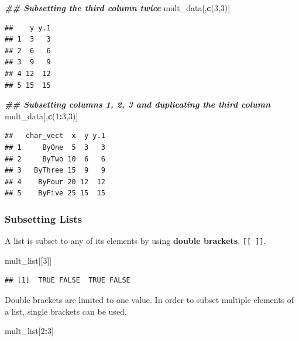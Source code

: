 \documentclass[
]{book}
\newenvironment{Shaded}{\begin{snugshade}}{\end{snugshade}}
\newcommand{\DecValTok}[1]{\textcolor[rgb]{0.00,0.00,0.81}{#1}}
\newcommand{\DocumentationTok}[1]{\textcolor[rgb]{0.56,0.35,0.01}{\textbf{\textit{#1}}}}
\newcommand{\FunctionTok}[1]{\textcolor[rgb]{0.13,0.29,0.53}{\textbf{#1}}}
\newcommand{\NormalTok}[1]{#1}
\newcommand{\SpecialCharTok}[1]{\textcolor[rgb]{0.81,0.36,0.00}{\textbf{#1}}}
\theoremstyle{definition}
\theoremstyle{definition}
\theoremstyle{definition}
\theoremstyle{definition}
\theoremstyle{remark}
\begin{document}
\begin{Shaded}
\begin{Highlighting}[]
\DocumentationTok{\#\# Subsetting the third column twice}
\NormalTok{mult\_data[,}\FunctionTok{c}\NormalTok{(}\DecValTok{3}\NormalTok{,}\DecValTok{3}\NormalTok{)]}
\end{Highlighting}
\end{Shaded}

\begin{verbatim}
##    y y.1
## 1  3   3
## 2  6   6
## 3  9   9
## 4 12  12
## 5 15  15
\end{verbatim}

\begin{Shaded}
\begin{Highlighting}[]
\DocumentationTok{\#\# Subsetting columns 1, 2, 3 and duplicating the third column}
\NormalTok{mult\_data[,}\FunctionTok{c}\NormalTok{(}\DecValTok{1}\SpecialCharTok{:}\DecValTok{3}\NormalTok{,}\DecValTok{3}\NormalTok{)]}
\end{Highlighting}
\end{Shaded}

\begin{verbatim}
##   char_vect  x  y y.1
## 1     ByOne  5  3   3
## 2     ByTwo 10  6   6
## 3   ByThree 15  9   9
## 4    ByFour 20 12  12
## 5    ByFive 25 15  15
\end{verbatim}

\hypertarget{subsetting-lists}{%
\subsubsection{Subsetting Lists}\label{subsetting-lists}}

A list is subset to any of its elements by using \textbf{double brackets}, \texttt{{[}{[}\ {]}{]}}.

\begin{Shaded}
\begin{Highlighting}[]
\NormalTok{mult\_list[[}\DecValTok{3}\NormalTok{]]}
\end{Highlighting}
\end{Shaded}

\begin{verbatim}
## [1]  TRUE FALSE  TRUE FALSE
\end{verbatim}

Double brackets are limited to one value. In order to subset multiple elements of a list, single brackets can be used.

\begin{Shaded}
\begin{Highlighting}[]
\NormalTok{mult\_list[}\DecValTok{2}\SpecialCharTok{:}\DecValTok{3}\NormalTok{]}
\end{Highlighting}
\end{Shaded}
\end{document}
